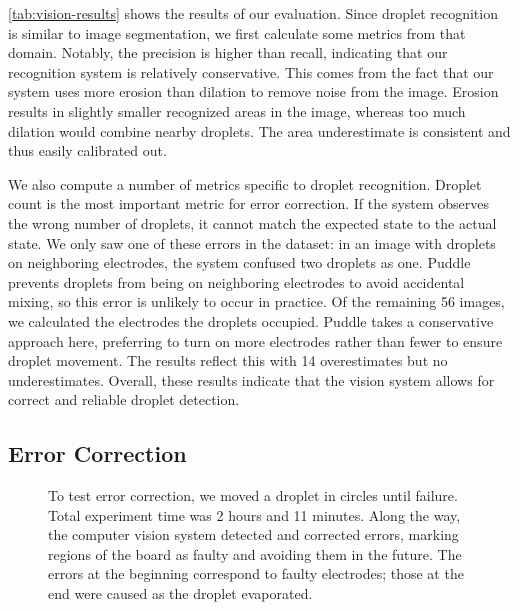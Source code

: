 \documentclass[sigconf, screen]{acmart}
\begin{document}
\autoref{tab:vision-results} shows the results of our evaluation.
Since droplet recognition is similar to image segmentation, we first calculate some metrics from that domain.
Notably, the precision is higher than recall, indicating that our recognition system is relatively conservative.
This comes from the fact that our system uses more erosion than dilation to remove noise from the image.
Erosion results in slightly smaller recognized areas in the image, whereas too much dilation would combine nearby droplets.
The area underestimate is consistent and thus easily calibrated out.

We also compute a number of metrics specific to droplet recognition.
Droplet count is the most important metric for error correction.
If the system observes the wrong number of droplets, it cannot match the expected state to the actual state.
We only saw one of these errors in the dataset: in an image with droplets on neighboring electrodes, the system confused two droplets as one.
Puddle prevents droplets from being on neighboring electrodes to avoid accidental mixing, so this error is unlikely to occur in practice.
Of the remaining 56 images, we calculated the electrodes the droplets occupied.
Puddle takes a conservative approach here, preferring to turn on more electrodes rather than fewer to ensure droplet movement.
The results reflect this with 14 overestimates but no underestimates.
Overall, these results indicate that the vision system allows for correct and reliable droplet detection.

\subsection{Error Correction}
\label{sec:endurance}

\begin{figure}
  \centering
  \caption{
    To test error correction, we moved a droplet in circles until failure.
    Total experiment time was 2 hours and 11 minutes.
    Along the way, the computer vision system detected and corrected errors, marking regions of the board as faulty and avoiding them in the future.
    The errors at the beginning correspond to faulty electrodes; those at the end were caused as the droplet evaporated.
  }
  \label{fig:endurance}
\end{figure}
\end{document}
